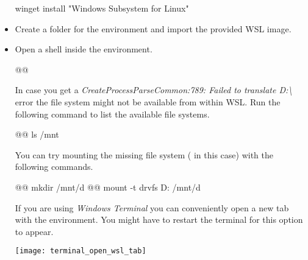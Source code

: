 \begin{itemize}
\begin{infobox}
          \begin{monobox}
winget install "Windows Subsystem for Linux"
\end{monobox}

    \end{infobox}

  \item Create a folder for the environment and import the provided WSL image.

  \item Open a shell inside the environment.

        \begin{monobox}
@\cmdinwsl{}@
\end{monobox}

    \begin{infobox}
      In case you get a \emph{CreateProcessParseCommon:789: Failed to translate D:\textbackslash} error the file system might not be available from within WSL.
      Run the following command to list the available file systems.

          \begin{monobox}
@\cmdinwsl{}@ ls /mnt
\end{monobox}

      You can try mounting the missing file system ( in this case) with the following commands.

          \begin{monobox}
@\cmdinwsl{}@ mkdir /mnt/d
@\cmdinwsl{}@ mount -t drvfs D: /mnt/d
\end{monobox}
    \end{infobox}
    \begin{infobox}
      If you are using \emph{Windows Terminal} you can conveniently open a new tab with the environment.
      You might have to restart the terminal for this option to appear.
      \begin{center}
        \texttt{[image: terminal\_open\_wsl\_tab]}
      \end{center}
    \end{infobox}
\end{itemize}
